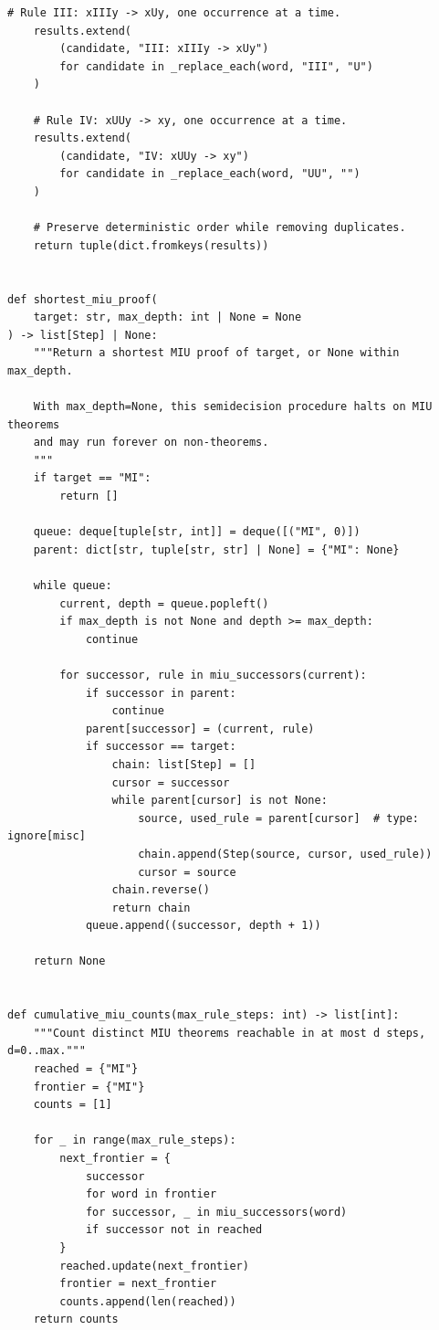 \documentclass[11pt,oneside]{book}
\theoremstyle{definition}
\theoremstyle{remark}
\begin{document}
\begin{lstlisting}[style=pythonstyle]
    # Rule III: xIIIy -> xUy, one occurrence at a time.
    results.extend(
        (candidate, "III: xIIIy -> xUy")
        for candidate in _replace_each(word, "III", "U")
    )

    # Rule IV: xUUy -> xy, one occurrence at a time.
    results.extend(
        (candidate, "IV: xUUy -> xy")
        for candidate in _replace_each(word, "UU", "")
    )

    # Preserve deterministic order while removing duplicates.
    return tuple(dict.fromkeys(results))


def shortest_miu_proof(
    target: str, max_depth: int | None = None
) -> list[Step] | None:
    """Return a shortest MIU proof of target, or None within max_depth.

    With max_depth=None, this semidecision procedure halts on MIU theorems
    and may run forever on non-theorems.
    """
    if target == "MI":
        return []

    queue: deque[tuple[str, int]] = deque([("MI", 0)])
    parent: dict[str, tuple[str, str] | None] = {"MI": None}

    while queue:
        current, depth = queue.popleft()
        if max_depth is not None and depth >= max_depth:
            continue

        for successor, rule in miu_successors(current):
            if successor in parent:
                continue
            parent[successor] = (current, rule)
            if successor == target:
                chain: list[Step] = []
                cursor = successor
                while parent[cursor] is not None:
                    source, used_rule = parent[cursor]  # type: ignore[misc]
                    chain.append(Step(source, cursor, used_rule))
                    cursor = source
                chain.reverse()
                return chain
            queue.append((successor, depth + 1))

    return None


def cumulative_miu_counts(max_rule_steps: int) -> list[int]:
    """Count distinct MIU theorems reachable in at most d steps, d=0..max."""
    reached = {"MI"}
    frontier = {"MI"}
    counts = [1]

    for _ in range(max_rule_steps):
        next_frontier = {
            successor
            for word in frontier
            for successor, _ in miu_successors(word)
            if successor not in reached
        }
        reached.update(next_frontier)
        frontier = next_frontier
        counts.append(len(reached))
    return counts



\end{lstlisting}
\end{document}
